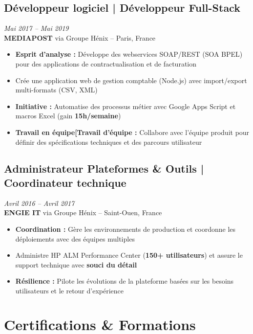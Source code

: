 \documentclass[11pt,a4paper]{article}
\newcommand{\highlight}[1]{\textcolor{primaryblue}{\textbf{#1}}}
\newcommand{\keypoint}[1]{\textbf{#1}}
\begin{document}
\subsection*{Développeur logiciel | Développeur Full-Stack} \hfill \textit{\color{mediumgray}Mai 2017 -- Mai 2019}\\
\textcolor{primaryblue}{\textbf{MEDIAPOST}} via Groupe Hénix -- Paris, France
\begin{itemize}[leftmargin=22pt]
    \item \highlight{Esprit d'analyse :} Développe des webservices SOAP/REST (SOA BPEL) pour des applications de contractualisation et de facturation
    \item Crée une application web de gestion comptable (Node.js) avec import/export multi-formats (CSV, XML)
    \item \highlight{Initiative :} Automatise des processus métier avec Google Apps Script et macros Excel (gain \keypoint{15h/semaine})
    \item \highlight{Travail en équipe[Travail d'équipe :} Collabore avec l'équipe produit pour définir des spécifications techniques et des parcours utilisateur
\end{itemize}

\subsection*{Administrateur Plateformes \& Outils | Coordinateur technique} \hfill \textit{\color{mediumgray}Avril 2016 -- Avril 2017}\\
\textcolor{primaryblue}{\textbf{ENGIE IT}} via Groupe Hénix -- Saint-Ouen, France
\begin{itemize}[leftmargin=22pt]
    \item \highlight{Coordination :} Gère les environnements de production et coordonne les déploiements avec des équipes multiples
    \item Administre HP ALM Performance Center (\keypoint{150+ utilisateurs}) et assure le support technique avec \highlight{souci du détail}
    \item \highlight{Résilience :} Pilote les évolutions de la plateforme basées sur les besoins utilisateurs et le retour d'expérience
\end{itemize}

\vspace{6pt}

\section*{Certifications \& Formations}
\end{document}
